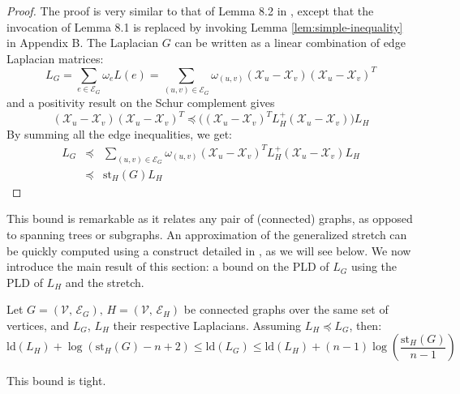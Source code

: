 \begin{proof}
The proof is very similar to that of Lemma 8.2 in \cite{Spielman2009b},
except that the invocation of Lemma 8.1 is replaced by invoking Lemma
\ref{lem:simple-inequality} in Appendix B. The Laplacian $G$ can
be written as a linear combination of edge Laplacian matrices: 
\[
L_{G}=\sum_{e\in\mathcal{E}_{G}}\omega_{e}L\left(e\right)=\sum_{\left(u,v\right)\in\mathcal{E}_{G}}\omega_{\left(u,v\right)}\left(\mathcal{X}_{u}-\mathcal{X}_{v}\right)\left(\mathcal{X}_{u}-\mathcal{X}_{v}\right)^{T}
\]
and a positivity result on the Schur complement gives%
\[
\left(\mathcal{X}_{u}-\mathcal{X}_{v}\right)\left(\mathcal{X}_{u}-\mathcal{X}_{v}\right)^{T}\preceq\Big(\left(\mathcal{X}_{u}-\mathcal{X}_{v}\right)^{T}L_{H}^{+}\left(\mathcal{X}_{u}-\mathcal{X}_{v}\right)\Big)L_{H}
\]
By summing all the edge inequalities, we get: 
\begin{eqnarray*}
L_{G} & \preceq & \sum_{\left(u,v\right)\in\mathcal{E}_{G}}\omega_{\left(u,v\right)}\left(\mathcal{X}_{u}-\mathcal{X}_{v}\right)^{T}L_{H}^{+}\left(\mathcal{X}_{u}-\mathcal{X}_{v}\right)L_{H}\\
 & \preceq & \text{st}_{H}\left(G\right)L_{H}
\end{eqnarray*}

\end{proof}
This bound is remarkable as it relates any pair of (connected) graphs,
as opposed to spanning trees or subgraphs. An approximation of the
generalized stretch can be quickly computed using a construct detailed
in \cite{Spielman2009}, as we will see below. We now introduce the
main result of this section: a bound on the PLD of $L_{G}$ using
the PLD of $L_{H}$ and the stretch. 
\begin{theorem}
\label{thm:stretch-pld-bounds}Let $G=\left(\mathcal{V},\,\mathcal{E}_{G}\right),\, H=\left(\mathcal{V},\,\mathcal{E}_{H}\right)$
be connected graphs over the same set of vertices, and $L_{G}$, $L_{H}$
their respective Laplacians. Assuming $L_{H}\preceq L_{G}$, then:
\begin{equation}
\text{ld}\left(L_{H}\right)+\log\left(\text{st}_{H}\left(G\right)-n+2\right)\leq\text{ld}\left(L_{G}\right)\leq\text{ld}\left(L_{H}\right)+\left(n-1\right)\log\left(\frac{\text{st}_{H}\left(G\right)}{n-1}\right)\label{eq:encadrement-1}
\end{equation}


This bound is tight.\end{theorem}
